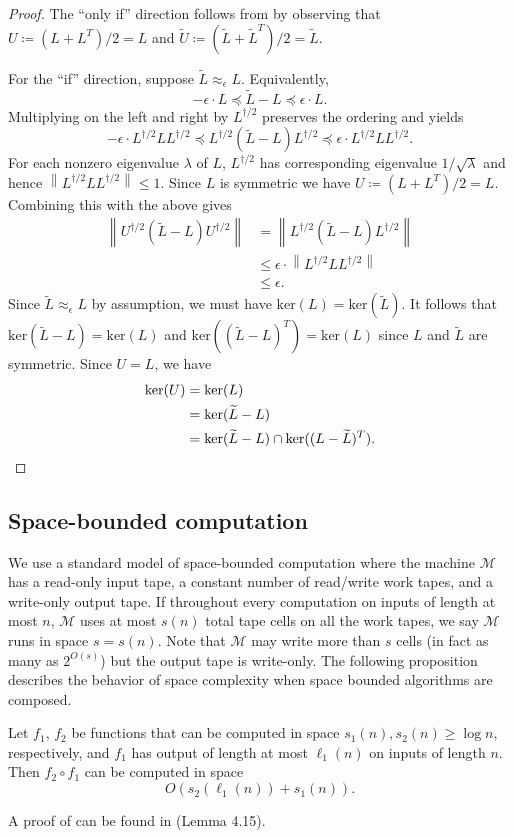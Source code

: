 \documentclass{toc}
\newcommand{\wt}{\widetilde}   %
\numberwithin{myalgctr}{section}
\theoremstyle{named}
\begin{document}
\begin{proof}
The ``only if'' direction follows from  by observing that $U\coloneqq(L+L^T)/2=L$ and $\wt{U}\coloneqq (\wt{L}+\wt{L}^T)/2=\wt{L}$.

For the ``if'' direction, suppose $\wt{L}\approx_{\epsilon}L$. Equivalently,
\[
-\epsilon\cdot L \preceq \wt{L}-L\preceq \epsilon\cdot L.
\]
Multiplying on the left and right by $L^{\dagger/2}$ preserves the ordering and yields
\[
-\epsilon\cdot L^{\dagger/2}LL^{\dagger/2} \preceq L^{\dagger/2}(\wt{L}-L)L^{\dagger/2}\preceq \epsilon\cdot L^{\dagger/2}LL^{\dagger/2}.
\]
For each nonzero eigenvalue $\lambda$ of $L$, $L^{\dagger/2}$ has corresponding eigenvalue $1/\sqrt{\lambda}$ and hence $\left\|L^{\dagger/2}LL^{\dagger/2}\right\|\leq 1$. Since $L$ is symmetric we have $U\coloneqq(L+L^T)/2 = L$. Combining this with the above gives 
\begin{align*}
 \left\|U^{\dagger/2}(\wt{L}-L)U^{\dagger/2}\right\|&= \left\|L^{\dagger/2}(\wt{L}-L)L^{\dagger/2}\right\|\\
&\leq \epsilon\cdot\left\|L^{\dagger/2}LL^{\dagger/2}\right\|\\
&\leq \epsilon.
\end{align*}
Since $\wt{L}\approx_{\epsilon}L$ by assumption, we must have $\mathrm{ker}(L)=\mathrm{ker}(\wt{L})$. It follows that $\mathrm{ker}(\wt{L}-L)=\mathrm{ker}(L)$ and $\mathrm{ker}((\wt{L}-L)^T)=\mathrm{ker}(L)$ since $L$ and $\wt{L}$ are symmetric. Since $U=L$, we have 
\begin{align*}
\mathrm{ker}(U)&=\mathrm{ker}(L)\\
&=\mathrm{ker}(\wt{L}-L)\\
&=\mathrm{ker}(\wt{L}-L)\cap\mathrm{ker}((L-\wt{L})^T).   \qedhere
\end{align*}
\end{proof}

%
\subsection{Space-bounded computation}   %
\label{sect:spacemodel}
We use a standard model of space-bounded computation where the machine $\mathcal{M}$ has a read-only input tape, a constant number of  read/write work tapes, and a write-only output tape. If throughout every computation on inputs of length at most $n$, $\mathcal{M}$ uses at most $s(n)$ total tape cells on all the work tapes, we say $\mathcal{M}$ runs in space $s=s(n)$. Note that $\mathcal{M}$ may write more than $s$ cells (in fact as many as $2^{O(s)}$) but the output tape is write-only. The following proposition describes the behavior of space complexity when space bounded algorithms are composed. 
\begin{proposition}
\label{prop:composition}
Let $f_1$, $f_2$ be functions that can be computed in space $s_1(n),s_2(n)\geq \log n$, respectively, and $f_1$ has output of length at most $\ell_1(n)$ on inputs of length $n$. Then $f_2\circ f_1$ can be computed in space 
\[
O(s_2(\ell_1(n)) + s_1(n)).
\]
\end{proposition}
A proof of  can be found in \cite{AroraBa09} (Lemma 4.15). 
%
\end{document}
